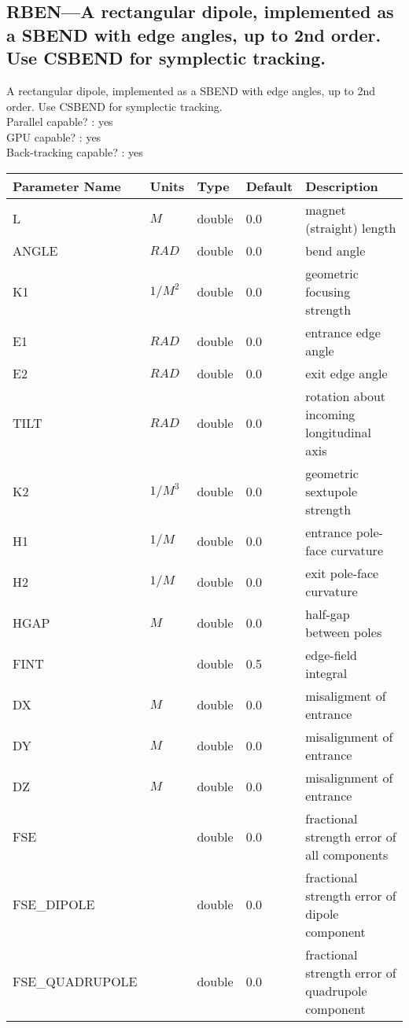 \subsection{RBEN---A rectangular dipole, implemented as a SBEND with edge angles, up to 2nd order. Use CSBEND for symplectic tracking.}
A rectangular dipole, implemented as a SBEND with edge angles, up to 2nd order. Use CSBEND for symplectic tracking.
\\
Parallel capable? : yes\\
GPU capable? : yes\\
Back-tracking capable? : yes\\
\begin{tabular}{|l|l|l|l|p{\descwidth}|} \hline
Parameter Name & Units & Type & Default & Description \\ \hline 
L & $M$ & double &  0.0 & magnet (straight) length  \\ \hline 
ANGLE & $RAD$ & double &  0.0 & bend angle  \\ \hline 
K1 & $1/M^{2}$ & double &  0.0 & geometric focusing strength  \\ \hline 
E1 & $RAD$ & double &  0.0 & entrance edge angle  \\ \hline 
E2 & $RAD$ & double &  0.0 & exit edge angle  \\ \hline 
TILT & $RAD$ & double &  0.0 & rotation about incoming longitudinal axis  \\ \hline 
K2 & $1/M^{3}$ & double &  0.0 & geometric sextupole strength  \\ \hline 
H1 & $1/M$ & double &  0.0 & entrance pole-face curvature  \\ \hline 
H2 & $1/M$ & double &  0.0 & exit pole-face curvature  \\ \hline 
HGAP & $M$ & double &  0.0 & half-gap between poles  \\ \hline 
FINT &  & double &   0.5 & edge-field integral  \\ \hline 
DX & $M$ & double &  0.0 & misaligment of entrance  \\ \hline 
DY & $M$ & double &  0.0 & misalignment of entrance  \\ \hline 
DZ & $M$ & double &  0.0 & misalignment of entrance  \\ \hline 
FSE &  & double &  0.0 & fractional strength error of all components  \\ \hline 
FSE\_DIPOLE &  & double &  0.0 & fractional strength error of dipole component  \\ \hline 
FSE\_QUADRUPOLE &  & double &  0.0 & fractional strength error of quadrupole component  \\ \hline 

\end{tabular}
